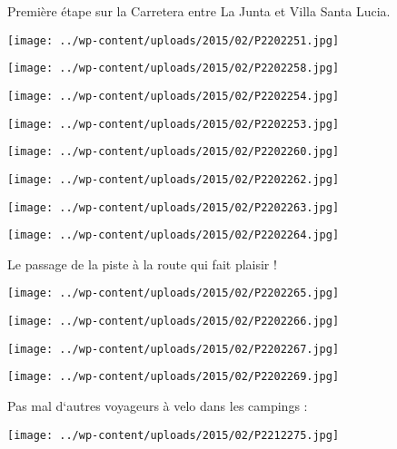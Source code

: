 Première étape sur la Carretera entre La Junta et Villa Santa Lucia.
\begin{center} \texttt{[image: ../wp-content/uploads/2015/02/P2202251.jpg]} \end{center}
\begin{center} \texttt{[image: ../wp-content/uploads/2015/02/P2202258.jpg]} \end{center}
\begin{center} \texttt{[image: ../wp-content/uploads/2015/02/P2202254.jpg]} \end{center}
\begin{center} \texttt{[image: ../wp-content/uploads/2015/02/P2202253.jpg]} \end{center}
\begin{center} \texttt{[image: ../wp-content/uploads/2015/02/P2202260.jpg]} \end{center}
\begin{center} \texttt{[image: ../wp-content/uploads/2015/02/P2202262.jpg]} \end{center}
\begin{center} \texttt{[image: ../wp-content/uploads/2015/02/P2202263.jpg]} \end{center}
\begin{center} \texttt{[image: ../wp-content/uploads/2015/02/P2202264.jpg]} \end{center}

\pagebreak
Le passage de la piste à la route qui fait plaisir !
\begin{center} \texttt{[image: ../wp-content/uploads/2015/02/P2202265.jpg]} \end{center}
\begin{center} \texttt{[image: ../wp-content/uploads/2015/02/P2202266.jpg]} \end{center}
\begin{center} \texttt{[image: ../wp-content/uploads/2015/02/P2202267.jpg]} \end{center}
\begin{center} \texttt{[image: ../wp-content/uploads/2015/02/P2202269.jpg]} \end{center}

\pagebreak
Pas mal d`autres voyageurs à velo dans les campings :
\begin{center} \texttt{[image: ../wp-content/uploads/2015/02/P2212275.jpg]} \end{center}

